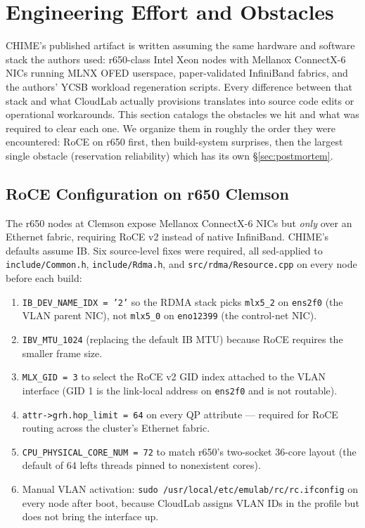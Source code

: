\documentclass[11pt,a4paper]{article}
\begin{document}
\section{Engineering Effort and Obstacles}
\label{sec:effort}


CHIME's published artifact is written assuming the same hardware and software stack the authors used: r650-class Intel Xeon nodes with Mellanox ConnectX-6 NICs running MLNX OFED userspace, paper-validated InfiniBand fabrics, and the authors' YCSB workload regeneration scripts. Every difference between that stack and what CloudLab actually provisions translates into source code edits or operational workarounds. This section catalogs the obstacles we hit and what was required to clear each one. We organize them in roughly the order they were encountered: RoCE on r650 first, then build-system surprises, then the largest single obstacle (reservation reliability) which has its own §\ref{sec:postmortem}.

\subsection{RoCE Configuration on r650 Clemson}
\label{sec:effort-roce}

The r650 nodes at Clemson expose Mellanox ConnectX-6 NICs but \emph{only} over an Ethernet fabric, requiring RoCE v2 instead of native InfiniBand. CHIME's defaults assume IB. Six source-level fixes were required, all sed-applied to \texttt{include/Common.h}, \texttt{include/Rdma.h}, and \texttt{src/rdma/Resource.cpp} on every node before each build:

\begin{enumerate}[nosep]
    \item \texttt{IB\_DEV\_NAME\_IDX = '2'} so the RDMA stack picks \texttt{mlx5\_2} on \texttt{ens2f0} (the VLAN parent NIC), not \texttt{mlx5\_0} on \texttt{eno12399} (the control-net NIC).
    \item \texttt{IBV\_MTU\_1024} (replacing the default IB MTU) because RoCE requires the smaller frame size.
    \item \texttt{MLX\_GID = 3} to select the RoCE v2 GID index attached to the VLAN interface (GID 1 is the link-local address on \texttt{ens2f0} and is not routable).
    \item \texttt{attr->grh.hop\_limit = 64} on every QP attribute --- required for RoCE routing across the cluster's Ethernet fabric.
    \item \texttt{CPU\_PHYSICAL\_CORE\_NUM = 72} to match r650's two-socket 36-core layout (the default of 64 lefts threads pinned to nonexistent cores).
    \item Manual VLAN activation: \texttt{sudo /usr/local/etc/emulab/rc/rc.ifconfig} on every node after boot, because CloudLab assigns VLAN IDs in the profile but does not bring the interface up.
\end{enumerate}
\end{document}
